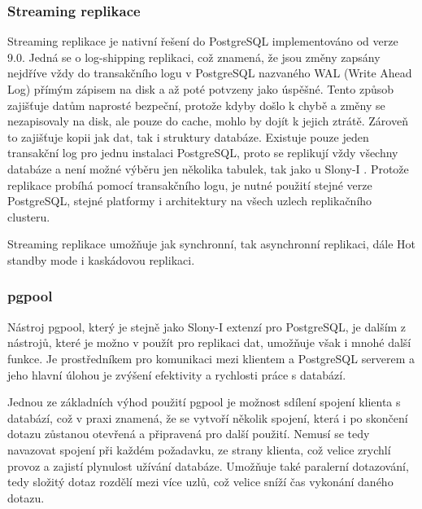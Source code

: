       \subsubsection{Streaming replikace}
      \label{kStreaming}

Streaming replikace je nativní řešení do PostgreSQL implementováno od verze 9.0. Jedná se o log-shipping replikaci, což znamená, že jsou změny zapsány nejdříve vždy do transakčního logu v PostgreSQL nazvaného WAL (Write Ahead Log) přímým zápisem na disk a až poté potvzeny jako úspěšné. Tento způsob zajišťuje datům naprosté bezpeční, protože kdyby došlo k chybě a změny se nezapisovaly na disk, ale pouze do cache, mohlo by dojít k jejich ztrátě. Zároveň to zajišťuje kopii jak dat, tak i struktury databáze. Existuje pouze jeden transakční log pro jednu instalaci PostgreSQL, proto se replikují vždy všechny databáze a není možné výběru jen několika tabulek, tak jako u Slony-I \citep{Boszormenyi2013}. Protože replikace probíhá pomocí transakčního logu, je nutné použití stejné verze PostgreSQL, stejné platformy i architektury na všech uzlech replikačního clusteru. 

Streaming replikace umožňuje jak synchronní, tak asynchronní replikaci, dále Hot standby mode i kaskádovou replikaci.

      \subsubsection{pgpool}
      \label{kpgpool}
Nástroj pgpool, který je stejně jako Slony-I extenzí pro PostgreSQL, je dalším z nástrojů, které je možno v použít pro replikaci dat, umožňuje však i mnohé další funkce. Je prostředníkem pro komunikaci mezi klientem a PostgreSQL serverem a jeho hlavní úlohou je zvýšení efektivity a rychlosti práce s databází. 

Jednou ze základních výhod použití pgpool je možnost sdílení spojení klienta s databází, což v praxi znamená, že se vytvoří několik spojení, která i po skončení dotazu zůstanou otevřená a připravená pro další použití. Nemusí se tedy navazovat spojení při každém požadavku, ze strany klienta, což velice zrychlí provoz a zajistí plynulost užívání databáze. Umožňuje také paralerní dotazování, tedy složitý dotaz rozdělí mezi více uzlů, což velice sníží čas vykonání daného dotazu. 

